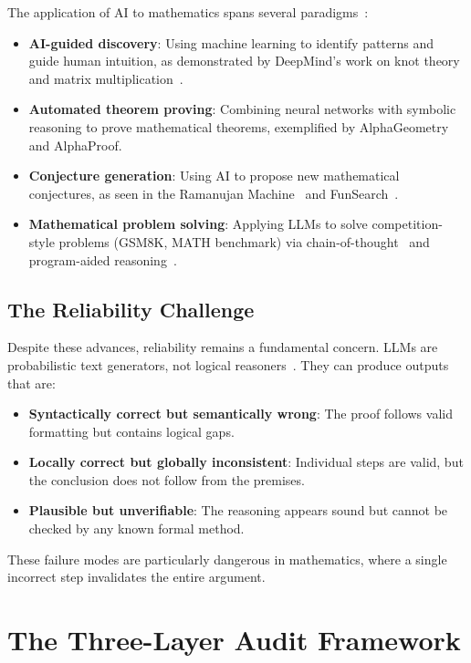 \documentclass[11pt,a4paper]{article}
\begin{document}
The application of AI to mathematics spans several paradigms~\cite{ju2025ai4math,chen2026lectures}:

\begin{itemize}
  \item \textbf{AI-guided discovery}: Using machine learning to identify patterns and guide human intuition, as demonstrated by DeepMind's work on knot theory and matrix multiplication~\cite{davies2021advancing,fawzi2022discovering}.
  \item \textbf{Automated theorem proving}: Combining neural networks with symbolic reasoning to prove mathematical theorems, exemplified by AlphaGeometry~\cite{trinh2024solving} and AlphaProof.
  \item \textbf{Conjecture generation}: Using AI to propose new mathematical conjectures, as seen in the Ramanujan Machine~\cite{raayoni2021generating} and FunSearch~\cite{romera2024mathematical}.
  \item \textbf{Mathematical problem solving}: Applying LLMs to solve competition-style problems (GSM8K, MATH benchmark) via chain-of-thought~\cite{wei2022chain} and program-aided reasoning~\cite{gao2023pal}.
\end{itemize}

\subsection{The Reliability Challenge}

Despite these advances, reliability remains a fundamental concern. LLMs are probabilistic text generators, not logical reasoners~\cite{chollet2019measure}. They can produce outputs that are:
\begin{itemize}
  \item \textbf{Syntactically correct but semantically wrong}: The proof follows valid formatting but contains logical gaps.
  \item \textbf{Locally correct but globally inconsistent}: Individual steps are valid, but the conclusion does not follow from the premises.
  \item \textbf{Plausible but unverifiable}: The reasoning appears sound but cannot be checked by any known formal method.
\end{itemize}

These failure modes are particularly dangerous in mathematics, where a single incorrect step invalidates the entire argument.

\section{The Three-Layer Audit Framework}
\label{sec:framework}
\end{document}
